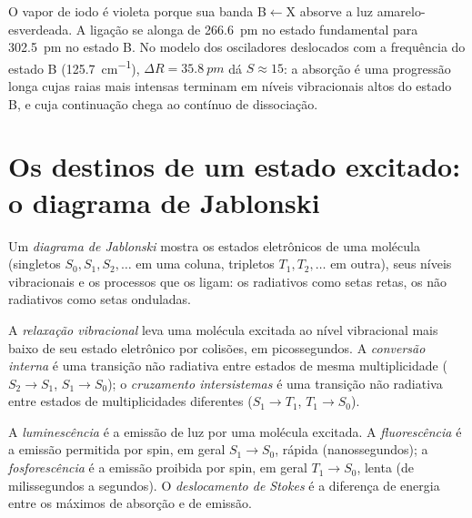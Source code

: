 \begin{example}[O iodo]\label{ex:b3:electronic-spectroscopy:iodine}
O vapor de iodo é violeta porque sua banda B$\leftarrow$X absorve a luz
amarelo-esverdeada. A ligação se alonga de \qty{266.6}{pm} no estado fundamental
para \qty{302.5}{pm} no estado B. No modelo dos osciladores deslocados com a
frequência do estado B (\qty{125.7}{cm^{-1}}), $\Delta R = \qty{35.8}{pm}$ dá $S \approx 15$: a
absorção é uma progressão longa cujas raias mais intensas terminam em níveis
vibracionais altos do estado B, e cuja continuação chega ao contínuo de dissociação.
\end{example}

\section{Os destinos de um estado excitado: o diagrama de Jablonski}

\begin{definition}\label{def:b3:electronic-spectroscopy:jablonski}
Um \emph{diagrama de Jablonski} mostra os estados
eletrônicos de uma molécula (singletos $S_0, S_1, S_2, \dots$ em uma coluna, tripletos $T_1, T_2,
\dots$ em outra), seus níveis vibracionais e os processos que os ligam:
os radiativos como setas retas, os não radiativos como setas onduladas.
\end{definition}

\begin{definition}\label{def:b3:electronic-spectroscopy:radiationless}
A \emph{relaxação vibracional} leva uma
molécula excitada ao nível vibracional mais baixo de seu estado eletrônico por
colisões, em picossegundos. A \emph{conversão interna}
é uma transição não radiativa entre estados de mesma
multiplicidade ($S_2 \to S_1$, $S_1 \to S_0$); o \emph{cruzamento
intersistemas} é uma transição não radiativa entre estados de
multiplicidades diferentes ($S_1 \to T_1$, $T_1 \to S_0$).
\end{definition}

\begin{definition}\label{def:b3:electronic-spectroscopy:luminescence}
A \emph{luminescência} é a emissão de luz por uma molécula
excitada. A \emph{fluorescência} é a emissão permitida por spin,
em geral $S_1 \to S_0$, rápida (nanossegundos); a \emph{fosforescência}
é a emissão proibida por spin, em geral $T_1 \to S_0$, lenta (de milissegundos a
segundos). O \emph{deslocamento de Stokes} é a diferença
de energia entre os máximos de absorção e de emissão.
\end{definition}

